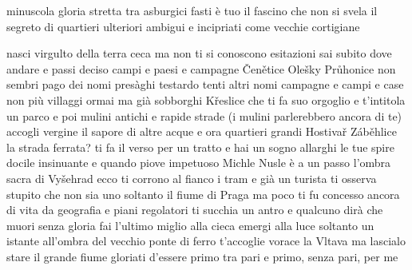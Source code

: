 \clearpage


\begin{poem}
	\begin{stanza}
		minuscola gloria stretta\verseline
		tra asburgici fasti\verseline
		è tuo il fascino che non si svela\verseline
		il segreto di quartieri ulteriori\verseline
		ambigui e incipriati\verseline
		come vecchie cortigiane
	\end{stanza}
\end{poem}

\clearpage


\begin{poem}
	\begin{stanza}
		nasci virgulto della terra ceca\verseline
		ma non ti si conoscono esitazioni\verseline
		sai subito dove andare\verseline
		e passi deciso campi e paesi e campagne\verseline
		Čenětice Olešky Průhonice\verseline
		non sembri pago dei nomi presàghi \verseline
		testardo tenti altri nomi\verseline
		campagne e campi e case\verseline
		non più villaggi ormai ma già sobborghi\verseline
		Křeslice\verseline
		che ti fa suo orgoglio e t'intitola un parco\verseline
		e poi mulini antichi e rapide strade\verseline
		(i mulini parlerebbero ancora di te)\verseline
		accogli vergine il sapore di altre acque\verseline
		e ora quartieri grandi\verseline
		Hostivař Záběhlice\verseline
		la strada ferrata? ti fa il verso per un tratto\verseline
		e hai un sogno\verseline
		allarghi le tue spire\verseline
		docile insinuante e quando piove impetuoso\verseline
		Michle\verseline
		Nusle\verseline
		è a un passo l'ombra sacra di Vyšehrad\verseline
		ecco ti corrono al fianco i tram e già\verseline
		un turista ti osserva stupito\verseline
		che non sia uno soltanto il fiume di Praga\verseline
		ma poco ti fu concesso ancora di vita\verseline
		da geografia e piani regolatori\verseline
		ti succhia un antro\verseline
		e qualcuno dirà che muori senza gloria\verseline
		fai l'ultimo miglio alla cieca\verseline
		emergi alla luce soltanto un istante\verseline
		all'ombra del vecchio ponte di ferro\verseline
		t'accoglie vorace la Vltava\verseline
		ma lascialo stare il grande fiume \verseline
		gloriati d'essere primo tra pari\verseline
		e primo, senza pari, per me
	\end{stanza}
\end{poem}

\clearpage


